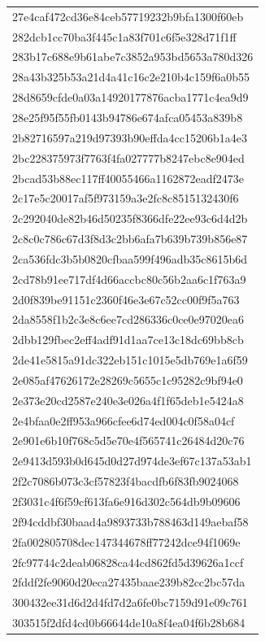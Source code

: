 \begin{tabular}{l}
27e4caf472cd36e84ceb57719232b9bfa1300f60eb \\
282dcb1cc70ba3f445c1a83f701c6f5e328d71f1ff \\
283b17c688e9b61abe7c3852a953bd5653a780d326 \\
28a43b325b53a21d4a41c16c2e210b4c159f6a0b55 \\
28d8659cfde0a03a14920177876acba1771c4ea9d9 \\
28e25f95f55fb0143b94786e674afca05453a839b8 \\
2b82716597a219d97393b90effda4cc15206b1a4e3 \\
2bc228375973f7763f4fa027777b8247ebc8e904ed \\
2bcad53b88ec117ff40055466a1162872eadf2473e \\
2c17e5c20017af5f973159a3e2fc8c8515132430f6 \\
2c292040de82b46d50235f8366dfe22ee93c6d4d2b \\
2c8c0c786c67d3f8d3c2bb6afa7b639b739b856e87 \\
2ca536fdc3b5b0820cfbaa599f496adb35c8615b6d \\
2cd78b91ee717df4d66accbc80c56b2aa6c1f763a9 \\
2d0f839be91151c2360f46e3e67c52cc00f9f5a763 \\
2da8558f1b2c3e8c6ee7cd286336c0ce0e97020ea6 \\
2dbb129fbec2eff4adf91d1aa7ce13c18dc69bb8cb \\
2de41e5815a91dc322eb151c1015e5db769e1a6f59 \\
2e085af47626172e28269c5655c1c95282c9bf94e0 \\
2e373e20cd2587e240e3e026a4f1f65deb1e5424a8 \\
2e4bfaa0e2ff953a966cfee6d74ed004c0f58a04cf \\
2e901e6b10f768c5d5e70e4f565741c26484d20c76 \\
2e9413d593b0d645d0d27d974de3ef67c137a53ab1 \\
2f2c7086b073c3cf57823f4bacdfb6f83fb9024068 \\
2f3031c4f6f59cf613fa6e916d302c564db9b09606 \\
2f94cddbf30baad4a9893733b788463d149aebaf58 \\
2fa002805708dec147344678ff77242dce94f1069e \\
2fc97744c2deab06828ca44cd862fd5d39626a1ccf \\
2fddf2fe9060d20eca27435baae239b82cc2bc57da \\
300432ee31d6d2d4fd7d2a6fe0bc7159d91e09c761 \\
303515f2dfd4cd0b66644de10a8f4ea04f6b28b684 \\

\end{tabular}
